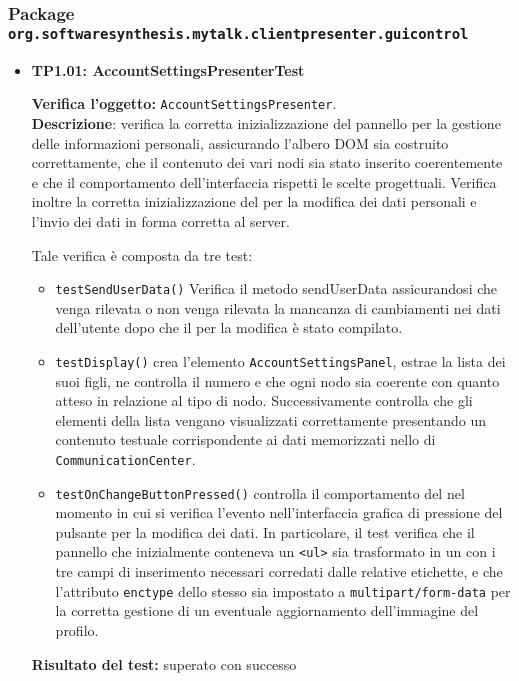 \subsubsection{Package \texttt{org.softwaresynthesis.mytalk.clientpresenter.guicontrol}}

\begin{itemize}
\item[\passed] \textbf{TP1.01: AccountSettingsPresenterTest}

\textbf{Verifica l'oggetto:} \texttt{AccountSettingsPresenter}.\\
\textbf{Descrizione}: verifica la corretta inizializzazione del pannello per la gestione delle informazioni personali, assicurando l'albero DOM sia costruito correttamente, che il contenuto dei vari nodi sia stato inserito coerentemente e che il comportamento dell'interfaccia rispetti le scelte progettuali. Verifica inoltre la corretta inizializzazione del  per la modifica dei dati personali e l'invio dei dati in forma corretta al server.

Tale verifica è composta da tre test:
\begin{itemize}

\item \texttt{testSendUserData()} Verifica il metodo sendUserData assicurandosi che venga rilevata o non venga rilevata la mancanza di cambiamenti nei dati dell'utente dopo che il  per la modifica è stato compilato.

\item \texttt{testDisplay()} crea l'elemento \texttt{AccountSettingsPanel}, estrae la lista dei suoi figli, ne controlla il numero e che ogni nodo sia coerente con quanto atteso in relazione al tipo di nodo.
Successivamente controlla che gli elementi della lista vengano visualizzati correttamente presentando un contenuto testuale corrispondente ai dati memorizzati nello  di \texttt{CommunicationCenter}.

\item \texttt{testOnChangeButtonPressed()} controlla il comportamento del  nel momento in cui si verifica l'evento nell'interfaccia grafica di pressione del pulsante per la modifica dei dati. In particolare, il test verifica che il pannello che inizialmente conteneva un \verb'<ul>' sia trasformato in un  con i tre campi di inserimento necessari corredati dalle relative etichette, e che l'attributo \verb'enctype' dello stesso sia impostato a \verb'multipart/form-data' per la corretta gestione di un eventuale aggiornamento dell'immagine del profilo.
\end{itemize}
\textbf{Risultato del test:} superato con successo


\end{itemize}
